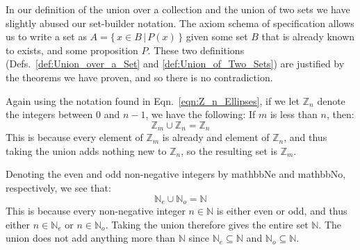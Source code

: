         In our definition of the union over a collection and the union of two
        sets we have slightly abused our set-builder
        notation. The axiom schema of
        specification allows us to write a
        set as $A=\{\,x\in{B}\,|\,P(x)\,\}$ given some set $B$ that is already
        known to exists, and some proposition $P$. These two
        definitions (Defs.~\ref{def:Union_over_a_Set} and
        \ref{def:Union_of_Two_Sets}) are justified by the theorems we have
        proven, and so there is no contradiction.
        \begin{example}
            \label{ex:Union_of_Zm_and_Zn}%
            Again using the notation found in Eqn.~\ref{eqn:Z_n_Ellipses}, if we
            let $\mathbb{Z}_{n}$ denote the integers between $0$ and $n-1$, we
            have the following: If $m$ is less than $n$, then:
            \begin{equation}
                \mathbb{Z}_{m}\cup\mathbb{Z}_{n}=\mathbb{Z}_{n}
            \end{equation}
            This is because every element of $\mathbb{Z}_{m}$ is already
            and element of $\mathbb{Z}_{n}$, and thus taking the union adds
            nothing new to $\mathbb{Z}_{n}$, so the resulting set is
            $\mathbb{Z}_{m}$.
        \end{example}
        \begin{example}
            Denoting the even and odd non-negative integers by \gls{mathbbNe}
            and \gls{mathbbNo}, respectively, we see that:
            \begin{equation}
                \mathbb{N}_{e}\cup\mathbb{N}_{o}=\mathbb{N}
            \end{equation}
            This is because every non-negative integer $n\in\mathbb{N}$ is
            either even or odd, and thus either $n\in\mathbb{N}_{e}$ or
            $n\in\mathbb{N}_{o}$. Taking the union therefore gives the entire
            set $\mathbb{N}$. The union does not add anything more than
            $\mathbb{N}$ since $\mathbb{N}_{e}\subseteq\mathbb{N}$ and
            $\mathbb{N}_{o}\subseteq\mathbb{N}$.
        \end{example}
